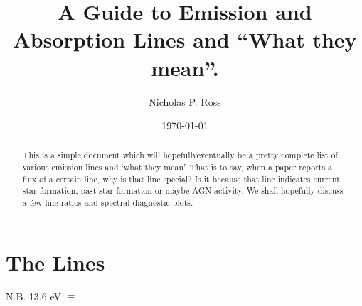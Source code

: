 \documentclass[11pt]{article}
\begin{document}
\title{A Guide to Emission and Absorption Lines and ``What they mean''.}
\author{Nicholas P. Ross}
\date{\today}
\maketitle


\begin{abstract}
This is a simple document which will hopefully\/eventually be a pretty complete
list of various emission lines and `what they mean'. That is to say, when a 
paper reports a flux of a certain line, why is that line special? Is it because
that line indicates current star formation, past star formation or maybe
AGN activity. We shall hopefully discuss a few line ratios and spectral
diagnostic plots. 
\end{abstract}

\section{The Lines}

\noindent
N.B. 13.6 eV $\equiv$
\end{document}
